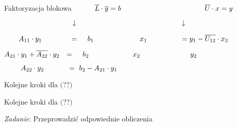 \begin{frame}{Faktoryzacja blokowa}
$\hspace*{10mm} \overline{L}\cdot\overline{y}=b\  \hspace*{40mm}\overline{U}\cdot x=y$

$\hspace*{33.5mm}\downarrow\ \hspace*{51mm} \downarrow$

$\hspace*{7mm}A_{11}\cdot y_{1}\ \hspace*{12.4mm} =\ \hspace*{3mm} b_{1}\ \hspace*{21.5mm} x_{1}\ \hspace*{15mm} = y_{1}-\overline{U_{12}}\cdot x_{2}$

$A_{21}\cdot y_{1}+\overline{A_{22}}\cdot y_{2}\hspace*{2.5mm} =\ \hspace*{3mm} b_{2}\ \hspace*{20.5mm} x_{2}\ \hspace*{23.5mm} y_{2} $

$\hspace*{8mm} A_{22}\cdot y_{2} \hspace*{11.5mm} =\ b_{2}-A_{21}\cdot y_{1}\ $

Kolejne kroki dla $($??$)$

Kolejne kroki dla $($??$)$
\begin{flushright}
{\it Zadanie}: Przeprowadzić odpowiednie obliczenia
\end{flushright}

\end{frame}